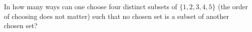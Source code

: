 In how many ways can one choose four distinct subsets of $\{1,2,3,4,5\}$ (the order of choosing does not matter) such that no chosen set is a subset of another chosen set?
